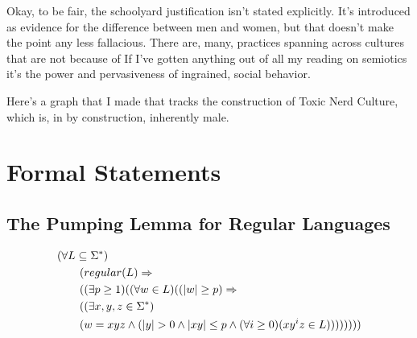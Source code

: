 \documentclass[../butidigress.tex]{subfiles}
\begin{document}
Okay, to be fair, the schoolyard justification isn't stated explicitly.
It's introduced as evidence for the  difference between men and women, but that doesn't make the point any less fallacious.
There are, many, practices spanning across cultures that are not because of 
If I've gotten anything out of all my reading on semiotics it's the power and pervasiveness of ingrained, social behavior.

\newpage
{}
Here's a graph that I made that tracks the construction of Toxic Nerd Culture, which is, in by construction, inherently male.

\begin{figure*}[htp]
\centering
{}
\end{figure*}

\section{Formal Statements}
\subsection{The Pumping Lemma for Regular Languages}
\newcommand{\tab}{\hspace*{2em}}
\begin{align*}
&(\forall L\subseteq \Sigma^{\ast}) \\
&\tab (regular(L) \Rightarrow \\
&\tab ((\exists p\geq 1)((\forall w\in L)((|w| \geq p) \Rightarrow \\
&\tab ((\exists x,y,z \in \Sigma^{\ast}) \\
&\tab (w=xyz \wedge (|y| > 0 \wedge |xy|\leq p \wedge (\forall i \geq 0)(xy^{i}z\in L))))))))
\end{align*}
\end{document}
